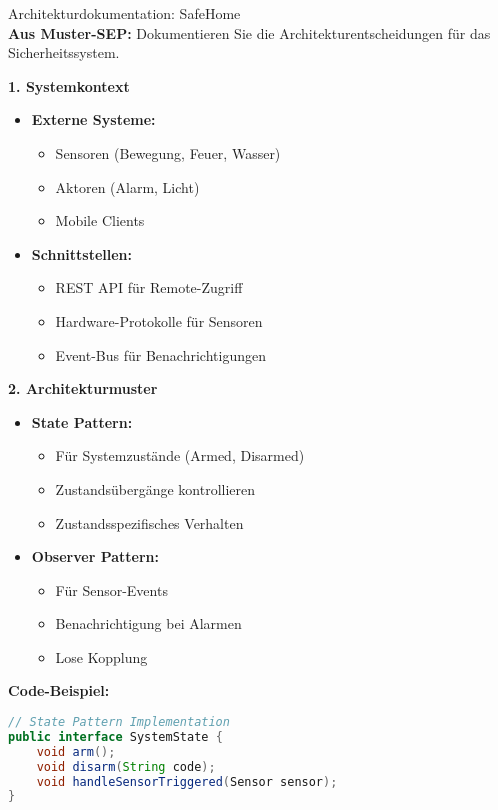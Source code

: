 \begin{example2}[breakable]{Architekturdokumentation: SafeHome}\\
\textbf{Aus Muster-SEP:} Dokumentieren Sie die Architekturentscheidungen für das Sicherheitssystem.

\textbf{1. Systemkontext}
\begin{itemize}
    \item \textbf{Externe Systeme:}
    \begin{itemize}
        \item Sensoren (Bewegung, Feuer, Wasser)
        \item Aktoren (Alarm, Licht)
        \item Mobile Clients
    \end{itemize}
    
    \item \textbf{Schnittstellen:}
    \begin{itemize}
        \item REST API für Remote-Zugriff
        \item Hardware-Protokolle für Sensoren
        \item Event-Bus für Benachrichtigungen
    \end{itemize}
\end{itemize}

\textbf{2. Architekturmuster}
\begin{itemize}
    \item \textbf{State Pattern:}
    \begin{itemize}
        \item Für Systemzustände (Armed, Disarmed)
        \item Zustandsübergänge kontrollieren
        \item Zustandsspezifisches Verhalten
    \end{itemize}
    
    \item \textbf{Observer Pattern:}
    \begin{itemize}
        \item Für Sensor-Events
        \item Benachrichtigung bei Alarmen
        \item Lose Kopplung
    \end{itemize}
\end{itemize}

\textbf{Code-Beispiel:}
\begin{lstlisting}[language=Java, style=basesmol]
// State Pattern Implementation
public interface SystemState {
    void arm();
    void disarm(String code);
    void handleSensorTriggered(Sensor sensor);
}


\end{lstlisting}
\end{example2}
